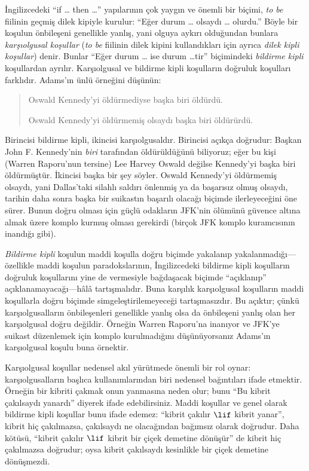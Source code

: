 



İngilizcedeki ``if \dots{} then \dots'' yapılarının çok yaygın ve önemli bir
biçimi, \emph{to be} fiilinin geçmiş dilek kipiyle kurulur: ``Eğer durum
\dots{} olsaydı \dots{} olurdu.'' Böyle bir koşulun önbileşeni genellikle
yanlış, yani olguya aykırı olduğundan bunlara \emph{karşıolgusal koşullar}
(\emph{to be} fiilinin dilek kipini kullandıkları için ayrıca \emph{dilek
kipli koşullar}) denir. Bunlar ``Eğer durum \dots{} ise durum \dots{}tir''
biçimindeki \emph{bildirme kipli} koşullardan ayrılır. Karşıolgusal ve
bildirme kipli koşulların doğruluk koşulları farklıdır. Adams'ın ünlü
örneğini düşünün:
\begin{quote}
  Oswald Kennedy'yi öldürmediyse başka biri öldürdü.

  Oswald Kennedy'yi öldürmemiş olsaydı başka biri öldürürdü.
\end{quote}
Birincisi bildirme kipli, ikincisi karşıolgusaldır. Birincisi açıkça doğrudur:
Başkan John F. Kennedy'nin \emph{biri} tarafından öldürüldüğünü biliyoruz;
eğer bu kişi (Warren Raporu'nun tersine) Lee Harvey Oswald değilse Kennedy'yi
başka biri öldürmüştür. İkincisi başka bir şey söyler. Oswald Kennedy'yi
öldürmemiş olsaydı, yani Dallas'taki silahlı saldırı önlenmiş ya da başarısız
olmuş olsaydı, tarihin daha sonra başka bir suikastın başarılı olacağı biçimde
ilerleyeceğini öne sürer. Bunun doğru olması için güçlü odakların JFK'nin
ölümünü güvence altına almak üzere komplo kurmuş olması gerekirdi (birçok JFK
komplo kuramcısının inandığı gibi).

\emph{Bildirme kipli} koşulun maddi koşulla doğru biçimde yakalanıp
yakalanmadığı---özellikle maddi koşulun paradokslarının, İngilizcedeki
bildirme kipli koşulların doğruluk koşullarını yine de vermesiyle bağdaşacak
biçimde ``açıklanıp'' açıklanamayacağı---hâlâ tartışmalıdır. Buna karşılık
karşıolgusal koşulların maddi koşullarla doğru biçimde simgeleştirilemeyeceği
tartışmasızdır. Bu açıktır; çünkü karşıolgusalların önbileşenleri genellikle
yanlış olsa da önbileşeni yanlış olan her karşıolgusal doğru değildir. Örneğin
Warren Raporu'na inanıyor ve JFK'ye suikast düzenlemek için komplo
kurulmadığını düşünüyorsanız Adams'ın karşıolgusal koşulu buna örnektir.

Karşıolgusal koşullar nedensel akıl yürütmede önemli bir rol oynar:
karşıolgusalların başlıca kullanımlarından biri nedensel bağıntıları ifade
etmektir. Örneğin bir kibriti çakmak onun yanmasına neden olur; bunu ``Bu
kibrit çakılsaydı yanardı'' diyerek ifade edebilirsiniz. Maddi koşullar ve
genel olarak bildirme kipli koşullar bunu ifade edemez: ``kibrit çakılır
$\lif$ kibrit yanar'', kibrit hiç çakılmazsa, çakılsaydı ne olacağından
bağımsız olarak doğrudur. Daha kötüsü, ``kibrit çakılır $\lif$ kibrit bir
çiçek demetine dönüşür'' de kibrit hiç çakılmazsa doğrudur; oysa kibrit
çakılsaydı kesinlikle bir çiçek demetine dönüşmezdi.

